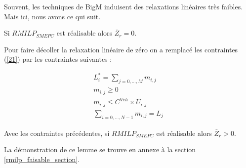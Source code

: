 Souvent, les techniques de BigM induisent des relaxations linéaires très faibles. Mais ici, nous avons ce qui suit.

\begin{Lem}
	Si \textit{$RMILP_{SMEPC}$} est réalisable alors $\bar{Z}_r=0$.
\end{Lem}

Pour faire décoller la relaxation linéaire de zéro on a remplacé les contraintes (\ref{21}) par les contraintes suivantes :

\begin{subequations}
	\begin{align}
	L^*_i=\sum_{j=0, \dots, M}m_{i,j} \\
	m_{i,j} \geq 0\\
	 m_{i,j} \leq C^{Veh} \times U_{i,j} \\
	 \sum_{i=0, \dots, N-1}m_{i,j}=L_j
	\end{align}
\end{subequations}


\begin{Lem}
	\label{rmilp_faisable}
Avec les contraintes précédentes, si \textit{$RMILP_{SMEPC}$} est réalisable alors $\bar{Z}_r>0$.
\end{Lem}
La démonstration de ce lemme se trouve en annexe à la section \ref{rmilp_faisable_section}.


